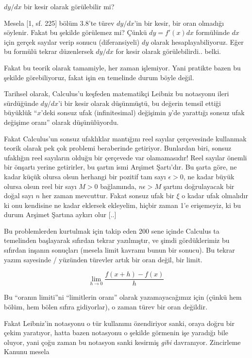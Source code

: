 \documentclass[12pt,fleqn]{article}\usepackage{../../common}
\begin{document}
\newpage

$dy/dx$ bir kesir olarak görülebilir mi? 

Mesela [1, sf. 225] bölüm 3.8'te türev $dy/dx$'in bir kesir, bir oran
olmadığı söylenir. Fakat bu şekilde görülemez mi? Çünkü $dy = f'(x)dx$
formülünde $dx$ için gerçek sayılar verip sonucu (diferansiyeli) $dy$
olarak hesaplayabiliyoruz. Eğer bu formülü tekrar düzenlersek $dy/dx$ for
kesir olarak görülebilirdi.. belki.

Fakat bu teorik olarak tamamiyle, her zaman işlemiyor. Yani pratikte bazen
bu şekilde görebiliyoruz, fakat işin en temelinde durum böyle değil.

Tarihsel olarak, Calculus'u keşfeden matematikçi Leibniz bu notasyonu ileri
sürdüğünde $dy/dx$'i bir kesir olarak düşünmüştü, bu değerin temsil ettiği
büyüklük ``$x$'deki sonsuz ufak (infinitesimal) değişimin $y$'de yarattığı
sonsuz ufak değişime oranı'' olarak düşünülüyordu.

Fakat Calculus'un sonsuz ufaklıklar mantığını reel sayılar çerçevesinde
kullanmak teorik olarak pek çok problemi beraberinde getiriyor. Bunlardan
biri, sonsuz ufaklığın reel sayıların olduğu bir çerçevede var
olamamasıdır! Reel sayılar önemli bir önşartı yerine getirirler, bu şartın
ismi Arşimet Şartı'dır. Bu şarta göre, ne kadar küçük olursa olsun herhangi
bir pozitif tam sayı $\epsilon > 0$, ne kadar büyük olursa olsun reel bir
sayı $M>0$ bağlamında, $n\epsilon > M$ şartını doğrulayacak bir doğal sayı
$n$ her zaman mevcuttur. Fakat sonsuz ufak bir $\xi$ o kadar ufak olmalıdır
ki onu kendisine ne kadar eklersek ekleyelim, hiçbir zaman 1'e erişemeyiz,
ki bu durum Arşimet Şartına aykırı olur [..]

Bu problemlerden kurtulmak için takip eden 200 sene içinde Calculus ta
temelinden başlayarak sıfırdan tekrar yazılmıştır, ve şimdi gördüklerimiz
bu sıfırdan inşanın sonuçları (mesela limit kavramı bunun bir sonucu). Bu
tekrar yazım sayesinde / yüzünden türevler artık bir oran değil, bir limit.

$$ \lim_{h \to 0} \frac{f(x+h) - f(x)}{h}$$

Bu ``oranın limiti''ni ``limitlerin oranı'' olarak yazamayacağımız için
(çünkü hem bölüm, hem bölen sıfıra gidiyorlar), o zaman türev bir oran
değildir.

Fakat Leibniz'in notasyonu o tür kullanımı özendiriyor sanki, oraya doğru bir
çekim yaratıyor, hatta bazen notasyonu o şekilde görmenin işe yaradığı bile
oluyor, yani çoğu zaman bu notasyon sanki kesirmiş {\em gibi}
davranıyor. Zincirleme Kanunu mesela
\end{document}
